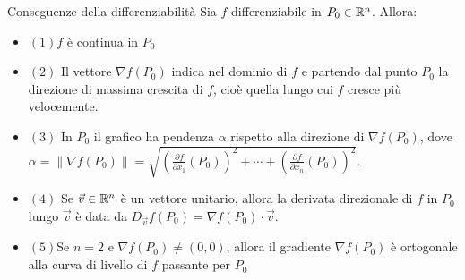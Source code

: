 \begin{teorema}{Conseguenze della differenziabilità}
  Sia $f$ differenziabile in $P_0 \in \mathbb{R}^n$. Allora:
  \begin{itemize}
    \item $(1) f$ è continua in $P_0$
    \item $(2)$ Il vettore $\nabla f(P_0)$ indica nel dominio di $f$ e partendo dal punto $P_0$ la direzione di massima crescita di $f$, cioè quella lungo cui $f$ cresce più velocemente.
    \item $(3)$ In $P_0$ il grafico ha pendenza $\alpha$ rispetto alla direzione di $\nabla f(P_0)$, dove $\alpha =  \|\nabla f(P_0)\| = \sqrt{\left(\frac{\partial f}{\partial x_1}(P_0)\right)^2 + \cdots + \left(\frac{\partial f}{\partial x_n}(P_0)\right)^2}$.
    \item $(4)$ Se $\vec{v}\in \mathbb{R}^n$ è un vettore unitario, allora la derivata direzionale di $f$ in $P_0$ lungo $\vec{v}$ è data da $D_{\vec{v}}f(P_0) = \nabla f(P_0) \cdot \vec{v}$.
    \item $(5) $Se $n=2$ e $\nabla f(P_0)\neq (0,0)$, allora il gradiente $\nabla f(P_0)$ è ortogonale alla curva di livello di $f$ passante per $P_0$
\end{itemize}
\end{teorema}



